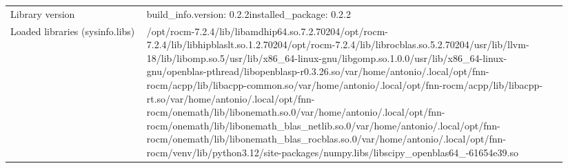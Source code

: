 \begin{longtable}{>{\raggedright\arraybackslash}p{0.23\linewidth}>{\raggedright\arraybackslash}p{0.71\linewidth}}
Library version & build\_\allowbreak{}info.version: 0.2.2\newline installed\_\allowbreak{}package: 0.2.2 \\
Loaded libraries (sysinfo.libs) & /\allowbreak{}opt/\allowbreak{}rocm-7.2.4/\allowbreak{}lib/\allowbreak{}libamdhip64.so.7.2.70204\newline /\allowbreak{}opt/\allowbreak{}rocm-7.2.4/\allowbreak{}lib/\allowbreak{}libhipblaslt.so.1.2.70204\newline /\allowbreak{}opt/\allowbreak{}rocm-7.2.4/\allowbreak{}lib/\allowbreak{}librocblas.so.5.2.70204\newline /\allowbreak{}usr/\allowbreak{}lib/\allowbreak{}llvm-18/\allowbreak{}lib/\allowbreak{}libomp.so.5\newline /\allowbreak{}usr/\allowbreak{}lib/\allowbreak{}x86\_\allowbreak{}64-linux-gnu/\allowbreak{}libgomp.so.1.0.0\newline /\allowbreak{}usr/\allowbreak{}lib/\allowbreak{}x86\_\allowbreak{}64-linux-gnu/\allowbreak{}openblas-pthread/\allowbreak{}libopenblasp-r0.3.26.so\newline /\allowbreak{}var/\allowbreak{}home/\allowbreak{}antonio/\allowbreak{}.local/\allowbreak{}opt/\allowbreak{}fnn-rocm/\allowbreak{}acpp/\allowbreak{}lib/\allowbreak{}libacpp-common.so\newline /\allowbreak{}var/\allowbreak{}home/\allowbreak{}antonio/\allowbreak{}.local/\allowbreak{}opt/\allowbreak{}fnn-rocm/\allowbreak{}acpp/\allowbreak{}lib/\allowbreak{}libacpp-rt.so\newline /\allowbreak{}var/\allowbreak{}home/\allowbreak{}antonio/\allowbreak{}.local/\allowbreak{}opt/\allowbreak{}fnn-rocm/\allowbreak{}onemath/\allowbreak{}lib/\allowbreak{}libonemath.so.0\newline /\allowbreak{}var/\allowbreak{}home/\allowbreak{}antonio/\allowbreak{}.local/\allowbreak{}opt/\allowbreak{}fnn-rocm/\allowbreak{}onemath/\allowbreak{}lib/\allowbreak{}libonemath\_\allowbreak{}blas\_\allowbreak{}netlib.so.0\newline /\allowbreak{}var/\allowbreak{}home/\allowbreak{}antonio/\allowbreak{}.local/\allowbreak{}opt/\allowbreak{}fnn-rocm/\allowbreak{}onemath/\allowbreak{}lib/\allowbreak{}libonemath\_\allowbreak{}blas\_\allowbreak{}rocblas.so.0\newline /\allowbreak{}var/\allowbreak{}home/\allowbreak{}antonio/\allowbreak{}.local/\allowbreak{}opt/\allowbreak{}fnn-rocm/\allowbreak{}venv/\allowbreak{}lib/\allowbreak{}python3.12/\allowbreak{}site-packages/\allowbreak{}numpy.libs/\allowbreak{}libscipy\_\allowbreak{}openblas64\_\allowbreak{}-61654e39.so \\

\end{longtable}
